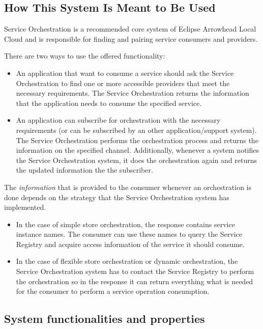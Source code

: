 \documentclass[a4paper]{arrowhead}
\begin{document}
\subsection{How This System Is Meant to Be Used}
\label{sec:use}

Service Orchestration is a recommended core system of Eclipse Arrowhead Local Cloud and is responsible for finding and pairing service consumers and providers. 

There are two ways to use the offered functionality:

\begin{itemize}
    \item An application that want to consume a service should ask the Service Orchestration to find one or more accessible providers that meet the necessary requirements. The Service Orchestration returns the information that the application needs to consume the specified service.
    \item An application can subscribe for orchestration with the necessary requirements (or can be subscribed by an other application/support system). The Service Orchestration performs the orchestration process and returns the information on the specified channel. Additionally, whenever a system notifies the Service Orchestration system, it does the orchestration again and returns the updated information the the subscriber.
\end{itemize}

The \textit{information} that is provided to the consumer whenever an orchestration is done depends on the strategy that the Service Orchestration system has implemented.

\begin{itemize}
    \item In the case of simple store orchestration, the response contains service instance names. The consumer can use these names to query the Service Registry and acquire access information of the service it should consume.
    \item In the case of flexible store orchestration or dynamic orchestration, the Service Orchestration system has to contact the Service Registry to perform the orchestration so in the response it can return everything what is needed for the consumer to perform a service operation consumption.
\end{itemize}

\subsection{System functionalities and properties}
\label{sec:properties}
\end{document}

